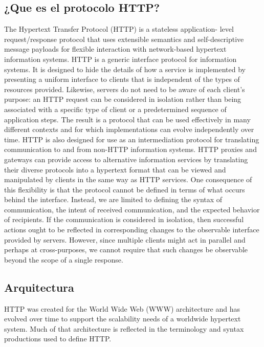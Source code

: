 \subsection{¿Que es el protocolo HTTP?}
The Hypertext Transfer Protocol (HTTP) is a stateless application-
   level request/response protocol that uses extensible semantics and
   self-descriptive message payloads for flexible interaction with
   network-based hypertext information systems.
   HTTP is a generic interface protocol for information systems.  It is
   designed to hide the details of how a service is implemented by
   presenting a uniform interface to clients that is independent of the
   types of resources provided.  Likewise, servers do not need to be
   aware of each client's purpose: an HTTP request can be considered in
   isolation rather than being associated with a specific type of client
   or a predetermined sequence of application steps.  The result is a
   protocol that can be used effectively in many different contexts and
   for which implementations can evolve independently over time.
   HTTP is also designed for use as an intermediation protocol for
   translating communication to and from non-HTTP information systems.
   HTTP proxies and gateways can provide access to alternative
   information services by translating their diverse protocols into a
   hypertext format that can be viewed and manipulated by clients in the
   same way as HTTP services.
   One consequence of this flexibility is that the protocol cannot be
   defined in terms of what occurs behind the interface.  Instead, we
   are limited to defining the syntax of communication, the intent of
   received communication, and the expected behavior of recipients.  If
   the communication is considered in isolation, then successful actions
   ought to be reflected in corresponding changes to the observable
   interface provided by servers.  However, since multiple clients might
   act in parallel and perhaps at cross-purposes, we cannot require that
   such changes be observable beyond the scope of a single response.
\subsection{Arquitectura}
HTTP was created for the World Wide Web (WWW) architecture and has
evolved over time to support the scalability needs of a worldwide
hypertext system.  Much of that architecture is reflected in the
terminology and syntax productions used to define HTTP.
